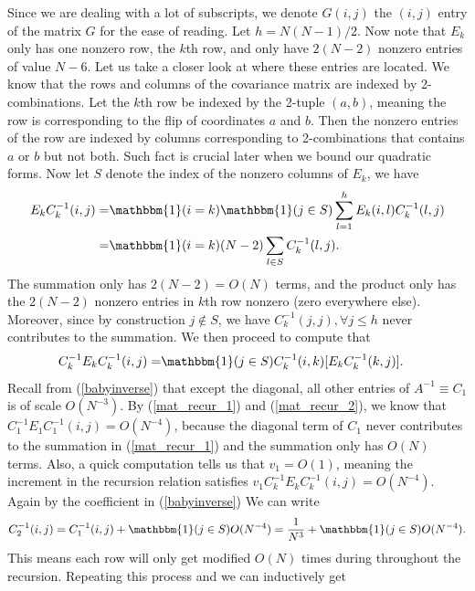 \documentclass[10pt]{article}
\newenvironment{Proof of lemma}{\noindent{\bf Proof of Lemma}}{\hfill$\Box$\newline}
\newenvironment{Proof of claim}{\noindent{\bf Proof of claim}}{\hfill$\Box$\newline}
\newenvironment{Proof of theorem}{\noindent{\bf Proof of Theorem}}{\hfill\scriptsize{$\Box$}\newline}
\newenvironment{Proof of theorems}{\noindent{\bf Proof of Theorems}}{\hfill$\Box$\newline}
\newenvironment{Proof of proposition}{\noindent{\bf Proof of Proposition}}{\hfill$\Box$\newline}
\newenvironment{Proof of propositions}{\noindent{\bf Proof of Propositions}}{\hfill$\Box$\newline}
\newenvironment{Proof of exercise}{\noindent{\it Proof of Exercise:}}{\hfill$\Box$}
\numberwithin{equation}{section}
\begin{document}
Since we are dealing with a lot of subscripts, we denote $G(i,j)$ the $(i,j)$ entry of the matrix $G$ for the ease of reading. Let $h = N(N-1)/2$. Now note that $E_k$ only has one nonzero row, the $k$th row, and only have $2(N-2)$ nonzero entries of value $N-6$. Let us take a closer look at where these entries are located. We know that the rows and columns of the covariance matrix are indexed by 2-combinations. Let the $k$th row be indexed by the 2-tuple $(a,b)$, meaning the row is corresponding to the flip of coordinates $a$ and $b$. Then the nonzero entries of the row are indexed by columns corresponding to 2-combinations that contains $a$ or $b$ but not both. Such fact is crucial later when we bound our quadratic forms. Now let $S$ denote the index of the nonzero columns of $E_k$, we have
\begin{align} \label{mat_recur_1}
    E_kC_k^{-1}(i,j) =& \mathbbm{1}(i=k) \mathbbm{1}(j \in S)\sum_{l=1}^{h}E_k(i,l)C_k^{-1}(l,j) \nonumber \\
    =& \mathbbm{1}(i=k) (N-2) \sum_{l \in S} C_k^{-1}(l,j).
\end{align}
The summation only has $2(N-2) = O(N)$ terms, and the product only has the $2(N-2)$ nonzero entries in $k$th row nonzero (zero everywhere else). Moreover, since by construction $j \notin S$, we have $C_k^{-1}(j,j), \forall j \leq h$ never contributes to the summation. We then proceed to compute that
\begin{align} \label{mat_recur_2}
    C_k^{-1}E_kC_k^{-1}(i,j) =& \mathbbm{1}(j \in S)C_k^{-1}(i,k)[E_kC_k^{-1}(k,j)].
\end{align}
Recall from (\ref{babyinverse}) that except the diagonal, all other entries of $A^{-1} \equiv C_1$ is of scale $O(N^{-3})$. By (\ref{mat_recur_1}) and (\ref{mat_recur_2}), we know that $C_1^{-1}E_1C_1^{-1}(i,j) = O(N^{-4})$, because the diagonal term of $C_1$ never contributes to the summation in (\ref{mat_recur_1}) and the summation only has $O(N)$ terms. Also, a quick computation tells us that $v_1 = O(1)$, meaning the increment in the recursion relation satisfies $v_1C_k^{-1}E_kC_k^{-1}(i,j) = O(N^{-4})$. Again by the coefficient in (\ref{babyinverse}) We can write
\begin{align} \label{mat_drift}
    C_2^{-1}(i,j) = C_1^{-1}(i,j)+ \mathbbm{1}(j \in S) O(N^{-4}) = \frac{1}{N^3} + \mathbbm{1}(j \in S)O(N^{-4}).
\end{align}
This means each row will only get modified $O(N)$ times during throughout the recursion. Repeating this process and we can inductively get
\end{document}
